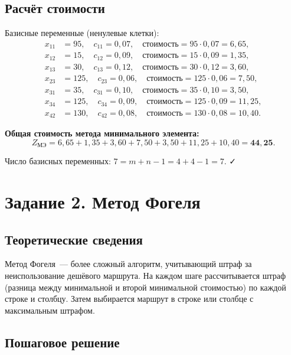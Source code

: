 \documentclass[a4paper, final]{article}
\begin{document}
\subsection{Расчёт стоимости}

Базисные переменные (ненулевые клетки):
\begin{align*}
x_{11} &= 95, \quad c_{11} = 0{,}07, \quad \text{стоимость} = 95 \cdot 0{,}07 = 6{,}65,\\
x_{12} &= 15, \quad c_{12} = 0{,}09, \quad \text{стоимость} = 15 \cdot 0{,}09 = 1{,}35,\\
x_{13} &= 30, \quad c_{13} = 0{,}12, \quad \text{стоимость} = 30 \cdot 0{,}12 = 3{,}60,\\
x_{23} &= 125, \quad c_{23} = 0{,}06, \quad \text{стоимость} = 125 \cdot 0{,}06 = 7{,}50,\\
x_{31} &= 35, \quad c_{31} = 0{,}10, \quad \text{стоимость} = 35 \cdot 0{,}10 = 3{,}50,\\
x_{34} &= 125, \quad c_{34} = 0{,}09, \quad \text{стоимость} = 125 \cdot 0{,}09 = 11{,}25,\\
x_{42} &= 130, \quad c_{42} = 0{,}08, \quad \text{стоимость} = 130 \cdot 0{,}08 = 10{,}40.
\end{align*}

\textbf{Общая стоимость метода минимального элемента:}
\[
Z_{\text{МЭ}} = 6{,}65 + 1{,}35 + 3{,}60 + 7{,}50 + 3{,}50 + 11{,}25 + 10{,}40 = \mathbf{44{,}25}.
\]

Число базисных переменных: $7 = m + n - 1 = 4 + 4 - 1 = 7$. ✓

\newpage

\section{Задание 2. Метод Фогеля}

\subsection{Теоретические сведения}

Метод Фогеля~--- более сложный алгоритм, учитывающий штраф за неиспользование
дешёвого маршрута. На каждом шаге рассчитывается штраф (разница между минимальной
и второй минимальной стоимостью) по каждой строке и столбцу. Затем выбирается
маршрут в строке или столбце с максимальным штрафом.

\subsection{Пошаговое решение}
\end{document}
